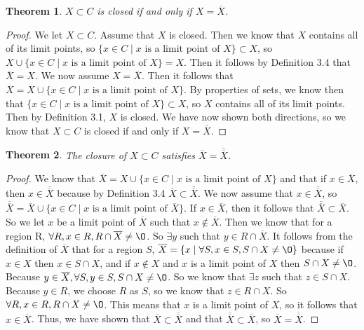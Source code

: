 \documentclass[12pt]{article}
\renewcommand{\emptyset}{\O}
\renewcommand{\_}[1]{\underline{ #1 }}
\newtheorem{theorem}{Theorem}[section]
\theoremstyle{definition}
\numberwithin{equation}{subsection}
\begin{document}
\begin{theorem}  $X \subset C$ is closed if and only if $X = \overline{X}$.
\end{theorem}

\begin{proof}
We let $X \subset C$.
Assume that $X$ is closed. Then we know that $X$ contains all of its limit points, so $\{x \in C \mid \text{$x$ is a limit point of $X$}\} \subset X$, so $X \cup \{x \in C \mid \text{$x$ is a limit point of $X$}\} = X$. Then it follows by Definition 3.4 that $\overline{X} = X$.
We now assume $X = \overline{X}$. Then it follows that $X = X \cup \{x \in C \mid \text{$x$ is a limit point of $X$}\}$. By properties of sets, we know then that $\{x \in C \mid \text{$x$ is a limit point of $X$}\} \subset X$, so $X$ contains all of its limit points. Then by Definition 3.1, $X$ is closed.
We have now shown both directions, so we know that $X \subset C$ is closed if and only if $X = \overline{X}$.
\end{proof}

\begin{theorem}  The closure of $X \subset C$ satisfies $\overline{X} = \overline{\overline{X}}$.
\end{theorem}
\begin{proof}
We know that $\overline{X} = X \cup \{x \in C \mid \text{$x$ is a limit point of $X$}\}$ and that if $x \in \overline{X}$, then $x \in \overline{\overline{X}}$ because by Definition 3.4 $\overline{X} \subset \overline{\overline{X}}$. We now assume that $x \in \overline{\overline{X}}$, so $\overline{\overline{X}} = \overline{X} \cup \{x \in C \mid \text{$x$ is a limit point of $\overline{X}$}\}$. If $x \in \overline{X}$, then it follows that $\overline{\overline{X}} \subset \overline{X}$. So we let $x$ be a limit point of $\overline{X}$ such that $x \not \in \overline{X}$. Then we know that for a region R, $\forall R, x \in R, R \cap \overline{X} \not = \emptyset$. So $\exists y$ such that $y \in R \cap \overline{X}$. It follows from the definition of $\overline{X}$ that for a region $S$, $\overline{X} = \{ x \mid \forall S, x \in S, S \cap X \not = \emptyset\}$ because if $x \in X$ then $x \in S \cap X$, and if $x \not \in X$ and $x$ is a limit point of $X$ then $S \cap X \not = \emptyset$. Because $y \in \overline{X}, \forall S, y \in S, S \cap X \not = \emptyset$. So we know that $\exists z$ such that $z \in S \cap X$. Because $y \in R$, we choose $R$ as $S$, so we know that $z \in R \cap X$. So $\forall R, x \in R, R \cap X \not = \emptyset$. This means that $x$ is a limit point of $X$, so it follows that $x \in \overline{X}$. Thus, we have shown that $\overline{X} \subset \overline{\overline{X}}$ and that $\overline{\overline{X}} \subset \overline{X}$, so $\overline{X} = \overline{\overline{X}}$.
\end{proof}
\end{document}
